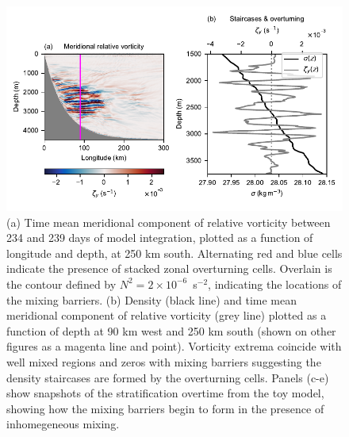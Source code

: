 \begin{figure}
    \centering
    \includegraphics{../figures/Figure3.pdf}
    \caption{(a) Time mean meridional component of relative vorticity between 234 and 239 days of model integration, plotted as a function of longitude and depth, at 250 km south. Alternating red and blue cells indicate the presence of stacked zonal overturning cells. Overlain is the contour defined by $N^2 = 2 \times 10^{-6}$~s$^{-2}$, indicating the locations of the mixing barriers. (b) Density (black line) and time mean meridional component of relative vorticity (grey line) plotted as a function of depth at 90 km west and 250 km south (shown on other figures as a magenta line and point). Vorticity extrema coincide with well mixed regions and zeros with mixing barriers suggesting the density staircases are formed by the overturning cells. Panels (c-e) show snapshots of the stratification overtime from the toy model, showing how the mixing barriers begin to form in the presence of inhomegeneous mixing.}
    \label{fig:StaircaseMechanism}
\end{figure}

